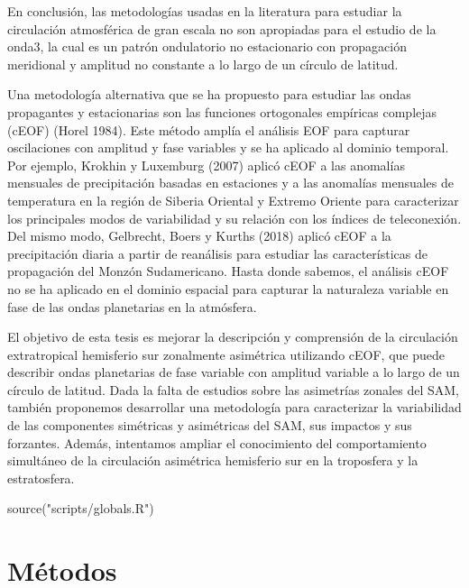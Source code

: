 \documentclass[12pt,oneside,a4paper]{reedthesis}
\newenvironment{Shaded}{\begin{snugshade}}{\end{snugshade}}
\newcommand{\FunctionTok}[1]{\textcolor[rgb]{0.00,0.00,0.00}{#1}}
\newcommand{\NormalTok}[1]{#1}
\newcommand{\StringTok}[1]{\textcolor[rgb]{0.31,0.60,0.02}{#1}}
\begin{document}
En conclusión, las metodologías usadas en la literatura para estudiar la circulación atmosférica de gran escala no son apropiadas para el estudio de la onda3, la cual es un patrón ondulatorio no estacionario con propagación meridional y amplitud no constante a lo largo de un círculo de latitud.

Una metodología alternativa que se ha propuesto para estudiar las ondas propagantes y estacionarias son las funciones ortogonales empíricas complejas (cEOF) (Horel 1984).
Este método amplía el análisis EOF para capturar oscilaciones con amplitud y fase variables y se ha aplicado al dominio temporal.
Por ejemplo, Krokhin y Luxemburg (2007) aplicó cEOF a las anomalías mensuales de precipitación basadas en estaciones y a las anomalías mensuales de temperatura en la región de Siberia Oriental y Extremo Oriente para caracterizar los principales modos de variabilidad y su relación con los índices de teleconexión.
Del mismo modo, Gelbrecht, Boers y Kurths (2018) aplicó cEOF a la precipitación diaria a partir de reanálisis para estudiar las características de propagación del Monzón Sudamericano.
Hasta donde sabemos, el análisis cEOF no se ha aplicado en el dominio espacial para capturar la naturaleza variable en fase de las ondas planetarias en la atmósfera.

El objetivo de esta tesis es mejorar la descripción y comprensión de la circulación extratropical hemisferio sur zonalmente asimétrica utilizando cEOF, que puede describir ondas planetarias de fase variable con amplitud variable a lo largo de un círculo de latitud.
Dada la falta de estudios sobre las asimetrías zonales del SAM, también proponemos desarrollar una metodología para caracterizar la variabilidad de las componentes simétricas y asimétricas del SAM, sus impactos y sus forzantes.
Además, intentamos ampliar el conocimiento del comportamiento simultáneo de la circulación asimétrica hemisferio sur en la troposfera y la estratosfera.

\begin{Shaded}
\begin{Highlighting}[]
\FunctionTok{source}\NormalTok{(}\StringTok{"scripts/globals.R"}\NormalTok{)}
\end{Highlighting}
\end{Shaded}

\hypertarget{muxe9todos}{%
\chapter{Métodos}\label{muxe9todos}}
\end{document}
